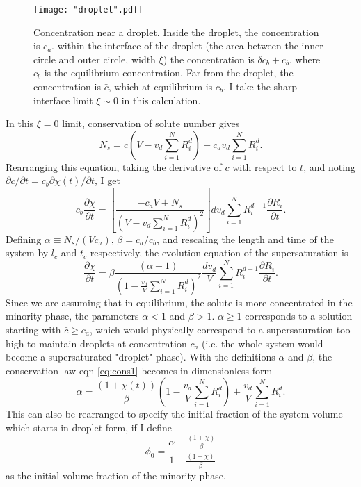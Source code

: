 \documentclass[12pt]{article}
\begin{document}
\begin{figure}[H]
	\centering
	\texttt{[image: "droplet".pdf]}
	\caption{Concentration near a droplet. Inside the droplet, the concentration is $c_a$. within the interface of the droplet (the area between the inner circle and outer circle, width $\xi$) the concentration is $\delta c_b+c_b$, where $c_b$ is the equilibrium concentration. Far from the droplet, the concentration is $\bar{c}$, which at equilibrium is $c_b$. I take the sharp interface limit $\xi\sim0$ in this calculation.}
\end{figure}\label{fig:droplet}

In this $\xi=0$ limit, conservation of solute number gives
\begin{equation}\label{eq:cons1}
N_s=\bar{c}\left(V-v_d\sum_{i=1}^NR_i^d\right)+c_av_d\sum_{i=1}^NR_i^d.
\end{equation}
Rearranging this equation, taking the derivative of $\bar{c}$ with respect to $t$, and noting $\partial\bar{c}/\partial t = c_b\partial \chi(t)/\partial t$, I get
\begin{equation}\label{eq:cons2}
c_b\frac{\partial\chi}{\partial t}=\left[\frac{-c_aV+N_s}{\left(V-v_d\sum_{i=1}^NR_i^d\right)^2}\right]dv_d\sum_{i=1}^NR_i^{d-1}\frac{\partial R_i}{\partial t}.
\end{equation}
Defining $\alpha\equiv N_s/(Vc_a)$, $\beta=c_a/c_b$, and rescaling the length and time of the system by $l_c$ and $t_c$ respectively, the evolution equation of the supersaturation is
\begin{equation}\label{eq:ss_evolution}
\frac{\partial\chi}{\partial t}=\beta\frac{(\alpha-1)}{\left(1-\frac{v_d}{V}\sum_{i=1}^NR_i^d\right)^2}\frac{dv_d}{V}\sum_{i=1}^NR_i^{d-1}\frac{\partial R_i}{\partial t}.
\end{equation}
Since we are assuming that in equilibrium, the solute is more concentrated in the minority phase, the parameters $\alpha<1$ and $\beta>1$. $\alpha\geq1$ corresponds to a solution starting with $\bar{c}\geq c_a$, which would physically correspond to a supersaturation too high to maintain droplets at concentration $c_a$ (i.e. the whole system would become a supersaturated "droplet" phase). With the definitions $\alpha$ and $\beta$, the conservation law eqn \ref{eq:cons1} becomes in dimensionless form
\begin{equation}\label{eq:rescaled_cons}
\alpha=\frac{(1+\chi(t))}{\beta}\left(1-\frac{v_d}{V}\sum_{i=1}^NR_i^d\right)+\frac{v_d}{V}\sum_{i=1}^NR_i^d.
\end{equation}
This can also be rearranged to specify the initial fraction of the system volume which starts in droplet form, if I define
\begin{equation}\label{eq:minority_fraction}
\phi_0=\frac{\alpha-\frac{(1+\chi)}{\beta}}{1-\frac{(1+\chi)}{\beta}}
\end{equation}
as the initial volume fraction of the minority phase.
\end{document}
